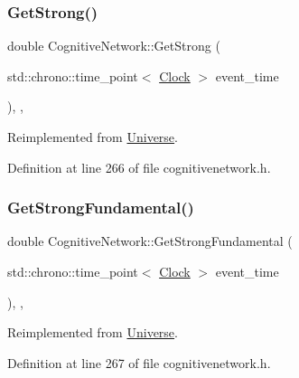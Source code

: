 \subsubsection{\texorpdfstring{Get\+Strong()}{GetStrong()}}
{\footnotesize\ttfamily double Cognitive\+Network\+::\+Get\+Strong (\begin{DoxyParamCaption}\item[{std\+::chrono\+::time\+\_\+point$<$ \mbox{\hyperlink{universe_8h_a0ef8d951d1ca5ab3cfaf7ab4c7a6fd80}{Clock}} $>$}]{event\+\_\+time }\end{DoxyParamCaption})\hspace{0.3cm}{\ttfamily [inline]}, {\ttfamily [final]}, {\ttfamily [virtual]}}



Reimplemented from \mbox{\hyperlink{class_universe_acb453ce71da418c5b5617fecede9571b}{Universe}}.



Definition at line 266 of file cognitivenetwork.\+h.

\mbox{\label{class_cognitive_network_a942ca90561fedae46136de620accbfea}} 
\subsubsection{\texorpdfstring{Get\+Strong\+Fundamental()}{GetStrongFundamental()}}
{\footnotesize\ttfamily double Cognitive\+Network\+::\+Get\+Strong\+Fundamental (\begin{DoxyParamCaption}\item[{std\+::chrono\+::time\+\_\+point$<$ \mbox{\hyperlink{universe_8h_a0ef8d951d1ca5ab3cfaf7ab4c7a6fd80}{Clock}} $>$}]{event\+\_\+time }\end{DoxyParamCaption})\hspace{0.3cm}{\ttfamily [inline]}, {\ttfamily [final]}, {\ttfamily [virtual]}}



Reimplemented from \mbox{\hyperlink{class_universe_ab44daccba01ee7e3cf9b50bba83dd19e}{Universe}}.



Definition at line 267 of file cognitivenetwork.\+h.

\mbox{\label{class_cognitive_network_acfa5de663b3e686c4d9ea1a3bb483b11}} 
